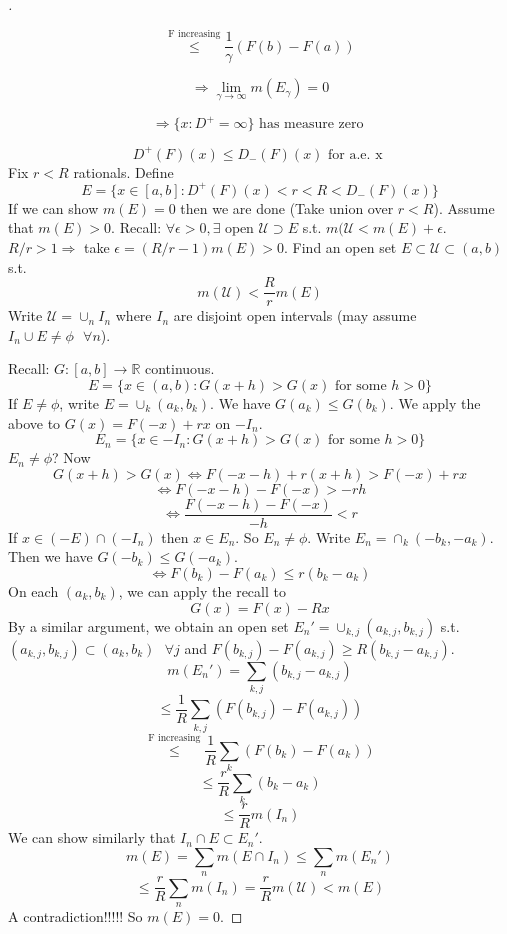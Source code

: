 \documentclass{article}
\theoremstyle{definition}
\newenvironment{proofs}[1][\proofname]{%
  \begin{proof}[#1]$ $\par\nobreak\ignorespaces
}{%
  \end{proof}
}
\newcommand{\sfa}{\text{  } \forall}
\begin{document}
\begin{proofs}
	$$\stackrel{\text{F increasing}}{\leq} \frac{1}{\gamma} (F(b) - F(a))$$

	$$\Rightarrow \lim_{\gamma \to \infty} m(E_\gamma) = 0$$

	$$\Rightarrow \{ x : D^+ = \infty\} \text{ has measure zero }$$

	\[
	  D^+(F)(x) \leq D_-(F)(x) \text{ for a.e. x }
	\]
	Fix $r < R$ rationals. Define 
	\[
	  E = \{x \in [a, b]: D^+(F)(x) < r < R < D_-(F)(x)\}
	\]
	If we can show $m(E) = 0$ then we are done (Take union over $r < R$). Assume that $m(E) > 0$. Recall: $\forall \epsilon > 0, \exists \text{ open } \mathcal{U} \supset E$ s.t. $m(\mathcal{U} < m(E) + \epsilon$. $R/r > 1 \Rightarrow$ take $\epsilon = (R/r - 1) m(E) > 0$. Find an open set $E \subset \mathcal{U} \subset (a, b)$ s.t. 
	\[
	  m(\mathcal{U}) < \frac{R}{r} m(E)
	\]
	Write $\mathcal{U} = \cup_{n} I_n$ where $I_n$ are disjoint open intervals (may assume $I_n \cup E \neq \phi \sfa n$). 
	\par Recall: $G:[a, b] \to \mathbb{R}$ continuous. 
	\[
	E = \{x \in (a, b) : G(x + h) > G(x) \text{ for some } h > 0\}
	\]
	If $E \neq \phi$, write $E = \cup_k(a_k, b_k)$. We have $G(a_k) \leq G(b_k)$. We apply the above to $G(x) = F(-x) + rx$ on $-I_n$. 
	\[
	  E_n = \{x \in -I_n: G(x + h) > G(x) \text{ for some }h > 0\}
	\]
	$E_n \neq \phi$? Now 
	\[
	  G(x + h) > G(x) \Leftrightarrow F(-x - h)+ r(x + h) > F(-x) + rx
	\]
	\[
	  \Leftrightarrow F(-x - h) - F(-x) > -rh
	\]
	\[
	  \Leftrightarrow \frac{F(-x - h) - F(-x)}{-h} < r
	\]
	If $x \in (-E) \cap (-I_n)$ then $x \in E_n$. So $E_n \neq \phi$. Write $E_n = \cap_k (-b_k, -a_k)$. Then we have $G(-b_k) \leq G(-a_k)$. 
	\[
	  \Leftrightarrow F(b_k) - F(a_k) \leq r (b_k - a_k)
	\]
	On each $(a_k, b_k)$, we can apply the recall to 
	\[
	  G(x) = F(x) - Rx
	\]
	By a similar argument, we obtain an open set $E_n' = \cup_{k, j} (a_{k, j}, b_{k, j})$ s.t. $(a_{k, j}, b_{k, j}) \subset (a_k, b_k) \sfa j$ and $F(b_{k, j}) - F(a_{k, j}) \geq R(b_{k, j} - a_{k, j})$. 
	\[
	  m(E_n') = \sum_{k, j} ( b_{k, j} - a_{k, j})
	\]
	\[
	  \leq \frac{1}{R} \sum_{k, j} (F(b_{k, j}) - F(a_{k, j}))
	\]
	\[
	  \stackrel{\text{F increasing}}{\leq} \frac{1}{R} \sum_{k} (F(b_k) - F(a_k))
	\]
	\[
	  \leq \frac{r}{R} \sum_k (b_k - a_k)
	\]
	\[
	  \leq \frac{r}{R} m(I_n)
	\]
	We can show similarly that $I_n \cap E \subset E_n'$. 
	\[
	  m(E) = \sum_n m(E \cap I_n) \leq \sum_n m(E_n')
	\]
	\[
	  \leq \frac{r}{R} \sum_n m(I_n) = \frac{r}{R} m(\mathcal{U}) < m(E)
	\]
	A contradiction!!!!! So $m(E) = 0$. 
\end{proofs}
\end{document}
